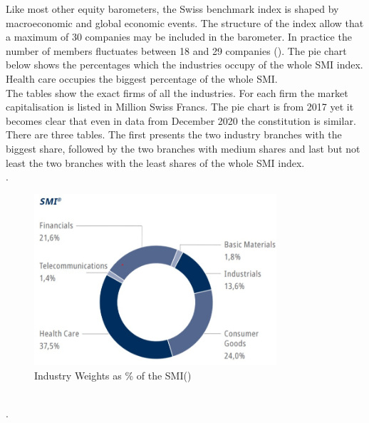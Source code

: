 \documentclass[11pt,a4paper]{article}
\begin{document}
\noindent Like most other equity barometers, the Swiss benchmark index is shaped by macroeconomic and global economic events. The structure of the index allow that a maximum of 30 companies may be included in the barometer. In practice the number of members fluctuates between 18 and 29 companies (\cite{MichaelRasch}). The pie chart below shows the percentages which the industries occupy of the whole SMI index. Health care occupies the biggest percentage of the whole SMI. \\

\noindent The tables show the exact firms of all the industries. For each firm the market capitalisation is listed in Million Swiss Francs. The pie chart is from 2017 yet it becomes clear that even in data from December 2020 the constitution is similar.
\\
There are three tables. The first presents the two industry branches with the biggest share, followed by the two branches with medium shares and last but not least the two branches with the least shares of the whole SMI index.\\
\pagebreak
.
\newline

\newline
\begin{figure}[h]
    \centering
    \caption{Industry Weights as \% of the SMI(\cite{SIXSwissExchangeAG})}
\includegraphics[width=90mm]{Pic.jpg}
\end{figure}

\\
.
\vspace{10mm}
\end{document}
